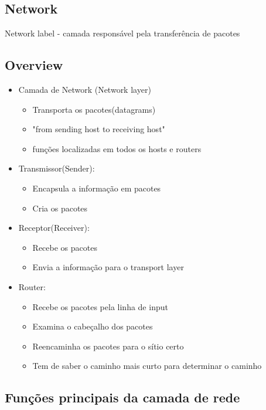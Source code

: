 \documentclass[../resumosRCOM.tex]{subfiles}
\begin{document}
 

\subsection{Network}
Network label - camada responsável pela transferência de pacotes

\subsection{Overview}
\begin{itemize}
    \item Camada de Network (Network layer)
    \begin{itemize}
        \item Transporta os pacotes(datagrams)
        \item "from sending host to receiving host"
        \item funções localizadas em todos os hosts e routers
    \end{itemize}
    \item Transmissor(Sender):
    \begin{itemize}
        \item Encapsula a informação em pacotes
        \item Cria os pacotes
    \end{itemize}
    \item Receptor(Receiver):
    \begin{itemize}
        \item Recebe os pacotes
	    \item Envia a informação para o transport layer
    \end{itemize}
    \item Router:
    \begin{itemize}
        \item Recebe os pacotes pela linha de input
        \item Examina o cabeçalho dos pacotes
	    \item Reencaminha os pacotes para o sítio certo
	    \item Tem de saber o caminho mais curto para determinar o caminho
    \end{itemize}
\end{itemize}

\subsection{Funções principais da camada de rede}
\end{document}
